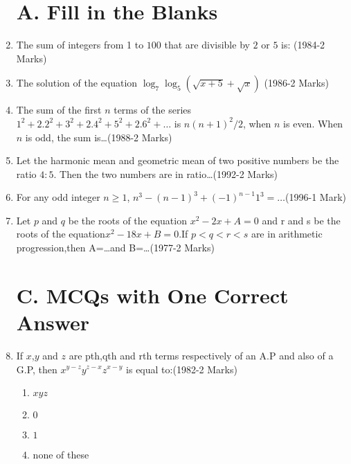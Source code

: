 \documentclass[journal,12pt,onecolumn]{IEEEtran}
\theoremstyle{remark}
\begin{document}
\begin{enumerate}
\section{A. Fill in the Blanks}


	\item  The sum of integers from 1 to $100$ that are divisible by $2$ or $5$ is: \hfill{(1984-2 Marks)}
    
    
	    \item  The solution of the equation                                    
		    ${\log_{7}\log_{5}(\sqrt{x+5}+\sqrt{x})}$ \hfill{(1986-2 Marks)}
     
     
	     \item The sum of the first $n$ terms of the series ${1^2+2.2^2+3^2+2.4^2+5^2+2.6^2+\dots}$ is
   ${n (n+1)^2 /2}$, when $n$ is even. When $n$ is odd, the sum 
   is\dots\hfill{(1988-2 Marks)}
        
          
		  \item Let the harmonic mean and geometric mean of two positive numbers be the ratio $4:5$. Then the two numbers are in 
			  ratio\dots\hfill{(1992-2 Marks)}
          
     
		  \item For any odd integer $n \ge 1$, ${n^3-(n-1)^3+(-1)^{n-1} 1^3=\dots}$\hfill{(1996-1 Mark)}
       
     
		  \item  Let $p$ and $q$ be the roots of the equation                    ${x^2-2x+A=0}$ and r and s be the roots of the                     equation${x^2-18x+B=0}$.If ${p<q<r<s}$ are                                      in arithmetic progression,then A=\dots and B=\dots\hfill{(1977-2 Marks)}
     
    
    \section{ C. MCQs with One Correct Answer}
        
    
	    \item  If $x$,$y$ and $z$ are pth,qth and rth terms respectively of an A.P and also of a G.P, then ${x^{y-z} y^{z-x} z^{x-y}}$ 
		    is equal to:\hfill{(1982-2 Marks)}
\begin{enumerate} 
  \item $xyz$ 
  \item $0$
  \item $1$ 
  \item none of these
  \end{enumerate}


\end{enumerate}
\end{document}
